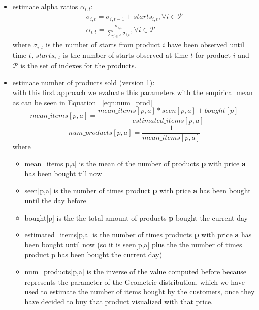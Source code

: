 \begin{itemize}
    \item estimate alpha ratios $\alpha_{i, t}$:
    \begin{align}
        \sigma_{i, t} = \sigma_{i, t - 1} + starts_{i, t}, \forall i \in \mathcal{P}\\
        \alpha_{i, t} = \frac{\sigma_{i, t}}{\sum_{j \in \mathcal{P}}\sigma_{j, t}},  \forall i \in \mathcal{P}
        \label{eqn:alpha}
    \end{align}
    where $\sigma_{i, t}$ is the number of starts from product $i$ have been observed until time $t$, $starts_{i, t}$ is the number of starts observed at time $t$ for product $i$ and $\mathcal{P}$ is the set of indexes for the products.
    \item estimate number of products sold (version 1):\\
    with this first approach we evaluate this parameters with the empirical mean as can be seen in Equation ~\ref{eqn:num_prod} \begin{equation}
        \label{eqn:mean_items}
        mean\_items[p,a] = \frac{mean\_items[p,a] * seen[p,a] + bought[p]}{estimated\_items[p,a]}
    \end{equation}\begin{equation}
        \label{eqn:num_prod}
        num\_products[p,a] = \frac{1}{mean\_items[p,a]}
    \end{equation}where\begin{itemize}
        \item mean\_items[p,a] is the mean of the number of products {\bf p} with price {\bf a} has been bought till now
        \item seen[p,a] is the number of times product {\bf p} with price {\bf a} has been bought until the day before
        \item bought[p] is the the total amount of products {\bf p} bought the current day
        \item estimated\_items[p,a] is the number of times products {\bf p} with price {\bf a} has been bought until now (so it is seen[p,a] plus the the number of times product p has been bought the current day)
        \item num\_products[p,a] is the inverse of the value computed before because represents the parameter of the Geometric distribution, which we have used to estimate the number of items bought by the customers, once they have decided to buy that product visualized with that price.
    \end{itemize}

\end{itemize}
